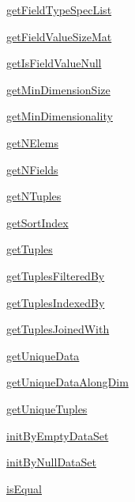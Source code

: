\begin{list}{}{}
 \item \hyperref[method:smartdb.relations.ATypifiedStaticRelation.getFieldTypeSpecList]{getFieldTypeSpecList}
 \item \hyperref[method:smartdb.relations.ATypifiedStaticRelation.getFieldValueSizeMat]{getFieldValueSizeMat}
 \item \hyperref[method:smartdb.relations.ATypifiedStaticRelation.getIsFieldValueNull]{getIsFieldValueNull}
 \item \hyperref[method:smartdb.relations.ATypifiedStaticRelation.getMinDimensionSize]{getMinDimensionSize}
 \item \hyperref[method:smartdb.relations.ATypifiedStaticRelation.getMinDimensionality]{getMinDimensionality}
 \item \hyperref[method:smartdb.relations.ATypifiedStaticRelation.getNElems]{getNElems}
 \item \hyperref[method:smartdb.relations.ATypifiedStaticRelation.getNFields]{getNFields}
 \item \hyperref[method:smartdb.relations.ATypifiedStaticRelation.getNTuples]{getNTuples}
 \item \hyperref[method:smartdb.relations.ATypifiedStaticRelation.getSortIndex]{getSortIndex}
 \item \hyperref[method:smartdb.relations.ATypifiedStaticRelation.getTuples]{getTuples}
 \item \hyperref[method:smartdb.relations.ATypifiedStaticRelation.getTuplesFilteredBy]{getTuplesFilteredBy}
 \item \hyperref[method:smartdb.relations.ATypifiedStaticRelation.getTuplesIndexedBy]{getTuplesIndexedBy}
 \item \hyperref[method:smartdb.relations.ATypifiedStaticRelation.getTuplesJoinedWith]{getTuplesJoinedWith}
 \item \hyperref[method:smartdb.relations.ATypifiedStaticRelation.getUniqueData]{getUniqueData}
 \item \hyperref[method:smartdb.relations.ATypifiedStaticRelation.getUniqueDataAlongDim]{getUniqueDataAlongDim}
 \item \hyperref[method:smartdb.relations.ATypifiedStaticRelation.getUniqueTuples]{getUniqueTuples}
 \item \hyperref[method:smartdb.relations.ATypifiedStaticRelation.initByEmptyDataSet]{initByEmptyDataSet}
 \item \hyperref[method:smartdb.relations.ATypifiedStaticRelation.initByNullDataSet]{initByNullDataSet}
 \item \hyperref[method:smartdb.relations.ATypifiedStaticRelation.isEqual]{isEqual}

\end{list}
